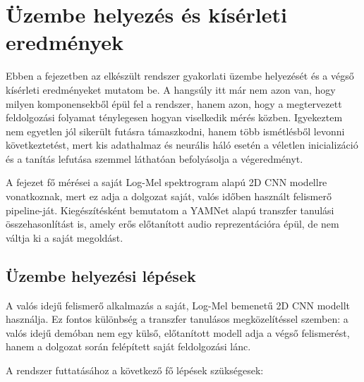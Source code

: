 \chapter{Üzembe helyezés és kísérleti eredmények}
\label{chap:uzembehelyezes}

Ebben a fejezetben az elkészült rendszer gyakorlati üzembe helyezését és a végső kísérleti eredményeket mutatom be. A hangsúly itt már nem azon van, hogy milyen komponensekből épül fel a rendszer, hanem azon, hogy a megtervezett feldolgozási folyamat ténylegesen hogyan viselkedik mérés közben. Igyekeztem nem egyetlen jól sikerült futásra támaszkodni, hanem több ismétlésből levonni következtetést, mert kis adathalmaz és neurális háló esetén a véletlen inicializáció és a tanítás lefutása szemmel láthatóan befolyásolja a végeredményt.

A fejezet fő mérései a saját Log-Mel spektrogram alapú 2D CNN modellre vonatkoznak, mert ez adja a dolgozat saját, valós időben használt felismerő pipeline-ját. Kiegészítésként bemutatom a YAMNet alapú transzfer tanulási összehasonlítást is, amely erős előtanított audio reprezentációra épül, de nem váltja ki a saját megoldást.

\section{Üzembe helyezési lépések}
\label{sec:uzembehelyezes}

A valós idejű felismerő alkalmazás a saját, Log-Mel bemenetű 2D CNN modellt használja. Ez fontos különbség a transzfer tanulásos megközelítéssel szemben: a valós idejű demóban nem egy külső, előtanított modell adja a végső felismerést, hanem a dolgozat során felépített saját feldolgozási lánc.

A rendszer futtatásához a következő fő lépések szükségesek:

